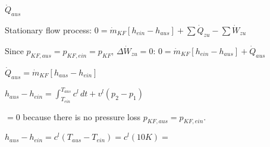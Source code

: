 \( \dot{Q}_{aus} \)  

Stationary flow process:  
\( 0 = \dot{m}_{KF} [h_{ein} - h_{aus}] + \sum \dot{Q}_{zu} - \sum \dot{W}_{zu} \)  

Since \( p_{KF,aus} = p_{KF,ein} = p_{KF} \), \( \Delta \dot{W}_{zu} = 0 \):  
\( 0 = \dot{m}_{KF} [h_{ein} - h_{aus}] + \dot{Q}_{aus} \)  

\( \dot{Q}_{aus} = \dot{m}_{KF} [h_{aus} - h_{ein}] \)  

\( h_{aus} - h_{ein} = \int_{T_{ein}}^{T_{aus}} c^l \, dt + v^l (p_2 - p_1) \)  

\( = 0 \) because there is no pressure loss \( p_{KF,aus} = p_{KF,ein} \).  

\( h_{aus} - h_{ein} = c^l (T_{aus} - T_{ein}) = c^l (10K) = \)